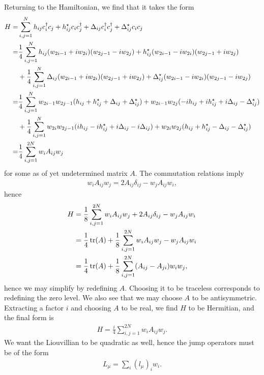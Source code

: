 Returning to the Hamiltonian, we find that it takes the form
\begin{align*}
	H =& \sum\limits_{i, j = 1}^{N}h_{ij}c_{i}^{\dagger} c_{j} + h_{ij}^{\star} c_{i}c_{j}^{\dagger} + \Delta_{ij}c_{i}^{\dagger} c_{j}^{\dagger} + \Delta_{ij}^{\star} c_{i}c_{j} \\
	  =& \frac{1}{4}\sum\limits_{i, j = 1}^{N}h_{ij}(w_{2i - 1} + iw_{2i})(w_{2j - 1} - iw_{2j}) + h_{ij}^{\star} (w_{2i - 1} - iw_{2i})(w_{2j - 1} + iw_{2j})  \\
	   &+ \frac{1}{4}\sum\limits_{i, j = 1}^{N}\Delta_{ij}(w_{2i - 1} + iw_{2i})(w_{2j - 1} + iw_{2j}) + \Delta_{ij}^{\star} (w_{2i - 1} - iw_{2i})(w_{2j - 1} - iw_{2j}) \\
	  =& \frac{1}{4}\sum\limits_{i, j = 1}^{N}w_{2i - 1}w_{2j - 1}(h_{ij} + h_{ij}^{\star} + \Delta_{ij} + \Delta_{ij}^{\star}) + w_{2i - 1}w_{2j}(-ih_{ij} + ih_{ij}^{\star} + i\Delta_{ij} - \Delta_{ij}^{\star})  \\
	   &+ \frac{1}{4}\sum\limits_{i, j = 1}^{N}w_{2i}w_{2j - 1}(ih_{ij} - ih_{ij}^{\star} + i\Delta_{ij} - i\Delta_{ij}) + w_{2i}w_{2j}(h_{ij} + h_{ij}^{\star} - \Delta_{ij} - \Delta_{ij}^{\star}) \\
	  =& \frac{1}{4}\sum\limits_{i, j = 1}^{2N}w_{i}A_{ij}w_{j}
\end{align*}
for some as of yet undetermined matrix $A$. The commutation relations imply
\begin{align*}
	w_{i}A_{ij}w_{j} = 2A_{ij}\delta_{ij} - w_{j}A_{ij}w_{i},
\end{align*}
hence
\begin{align*}
	H &= \frac{1}{8}\sum\limits_{i, j = 1}^{2N}w_{i}A_{ij}w_{j} + 2A_{ij}\delta_{ij} - w_{j}A_{ij}w_{i} \\
	  &= \frac{1}{4}\tr(A) + \frac{1}{8}\sum\limits_{i, j = 1}^{2N}w_{i}A_{ij}w_{j} - w_{j}A_{ij}w_{i} \\
	  &= \frac{1}{4}\tr(A) + \frac{1}{8}\sum\limits_{i, j = 1}^{2N}(A_{ij} - A_{ji})w_{i}w_{j},
\end{align*}
hence we may simplify by redefining $A$. Choosing it to be traceless corresponds to redefining the zero level. We also see that we may choose $A$ to be antisymmetric. Extracting a factor $i$ and choosing $A$ to be real, we find $H$ to be Hermitian, and the final form is
\begin{align*}
	H = \frac{i}{4}\sum\limits_{i, j = 1}^{2N}w_{i}A_{ij}w_{j}.
\end{align*}
We want the Liouvillian to be quadratic as well, hence the jump operators must be of the form
\begin{align*}
	L_{\mu} = \sum\limits_{i}(l_{\mu})_{i}w_{i}.
\end{align*}

